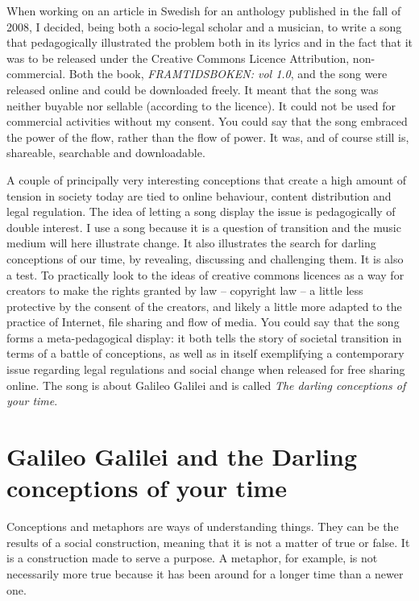 When working on an article in Swedish for an anthology published in the fall of
2008, I decided, being both a socio-legal scholar and a musician, to write a
song that pedagogically illustrated the problem both in its lyrics and in the
fact that it was to be released under the Creative Commons Licence Attribution,
non-commercial. Both the book, \textit{FRAMTIDSBOKEN: vol
1.0}\cite{darling-hyden08}, and the song were released online and could be
downloaded freely. It meant that the song was neither buyable nor sellable
(according to the licence). It could not be used for commercial activities
without my consent. You could say that the song embraced the power of the f\hbox{}low,
rather than the f\hbox{}low of power. It was, and of course still is, shareable,
searchable and downloadable.

A couple of principally very interesting conceptions that create a high amount
of tension in society today are tied to online behaviour, content distribution
and legal regulation. The idea of letting a song display the issue is
pedagogically of double interest. I use a song because it is a question of
transition and the music medium will here illustrate change. It also illustrates
the search for darling conceptions of our time, by revealing, discussing and
challenging them. It is also a test. To practically look to the ideas of
creative commons licences as a way for creators to make the rights granted by
law – copyright law – a little less protective by the consent of the creators,
and likely a little more adapted to the practice of Internet, f\hbox{}ile sharing and
f\hbox{}low of media. You could say that the song forms a meta-pedagogical display: it
both tells the story of societal transition in terms of a battle of conceptions,
as well as in itself exemplifying a contemporary issue regarding legal
regulations and social change when released for free sharing online. The song is
about Galileo Galilei and is called \textit{The darling conceptions of your
time}.


\section{Galileo Galilei and the Darling conceptions of your time}
\label{s:darling_conceptions:galileo_galilei_darling_conceptions}

Conceptions and metaphors are ways of understanding things. They can be the
results of a social construction, meaning that it is not a matter of true or
false. It is a construction made to serve a purpose. A metaphor, for example, is
not necessarily more true because it has been around for a longer time than a
newer one.

